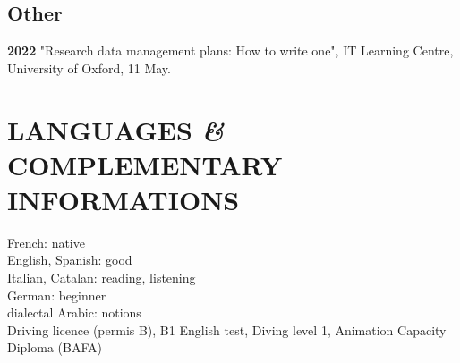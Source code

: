 \documentclass{article}
\begin{document}
\subsection*{Other}

\textbf{2022 }"Research data management plans: How to write one", IT Learning Centre, University of Oxford, 11 May.
\smallbreak

\section*{LANGUAGES \textit{\&} COMPLEMENTARY INFORMATIONS}

French: native \\
English, Spanish: good \\
Italian, Catalan: reading, listening \\
German: beginner \\
dialectal Arabic: notions \\

Driving licence (permis B), B1 English test, Diving level 1, Animation Capacity Diploma (BAFA)
\end{document}
